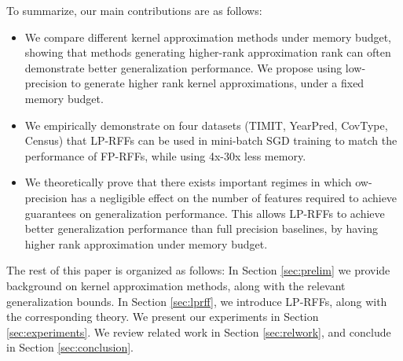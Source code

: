 To summarize, our main contributions are as follows:
\begin{itemize}
	\item We compare different kernel approximation methods under memory budget, showing that methods generating higher-rank approximation rank can often demonstrate better generalization performance. We propose using low-precision to generate higher rank kernel approximations, under a fixed memory budget. 

	\item We empirically demonstrate on four datasets (TIMIT, YearPred, CovType, Census) that LP-RFFs can be used in mini-batch SGD training to match the performance of FP-RFFs, while using 4x-30x less memory.

	\item We theoretically prove that there exists important regimes in which ow-precision has a negligible effect on the number of features required to achieve guarantees on generalization performance. This allows LP-RFFs to achieve better generalization performance than full precision baselines, by having higher rank approximation under memory budget. 
\end{itemize}

The rest of this paper is organized as follows:   In Section \ref{sec:prelim} we provide background on kernel approximation methods, along with the relevant generalization bounds. In Section \ref{sec:lprff}, we introduce LP-RFFs, along with the corresponding theory.  We present our experiments in Section \ref{sec:experiments}.  We review related work in Section \ref{sec:relwork}, and conclude in Section \ref{sec:conclusion}.


